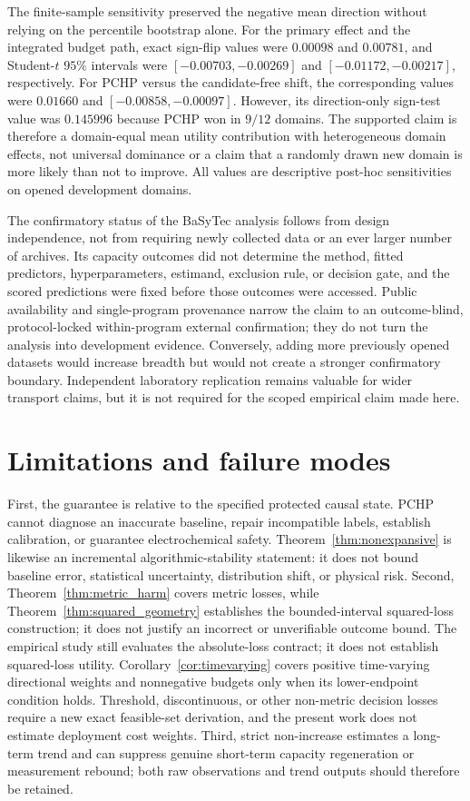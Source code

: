 \documentclass[11pt]{article}
\begin{document}
The finite-sample sensitivity preserved the negative mean direction without relying on the percentile bootstrap alone. For the primary effect and the integrated budget path, exact sign-flip values were $0.00098$ and $0.00781$, and Student-$t$ $95\%$ intervals were $[-0.00703,-0.00269]$ and $[-0.01172,-0.00217]$, respectively. For PCHP versus the candidate-free shift, the corresponding values were $0.01660$ and $[-0.00858,-0.00097]$. However, its direction-only sign-test value was $0.145996$ because PCHP won in $9/12$ domains. The supported claim is therefore a domain-equal mean utility contribution with heterogeneous domain effects, not universal dominance or a claim that a randomly drawn new domain is more likely than not to improve. All values are descriptive post-hoc sensitivities on opened development domains.

The confirmatory status of the BaSyTec analysis follows from design independence, not from requiring newly collected data or an ever larger number of archives. Its capacity outcomes did not determine the method, fitted predictors, hyperparameters, estimand, exclusion rule, or decision gate, and the scored predictions were fixed before those outcomes were accessed. Public availability and single-program provenance narrow the claim to an outcome-blind, protocol-locked within-program external confirmation; they do not turn the analysis into development evidence. Conversely, adding more previously opened datasets would increase breadth but would not create a stronger confirmatory boundary. Independent laboratory replication remains valuable for wider transport claims, but it is not required for the scoped empirical claim made here.

\section{Limitations and failure modes}

First, the guarantee is relative to the specified protected causal state. PCHP cannot diagnose an inaccurate baseline, repair incompatible labels, establish calibration, or guarantee electrochemical safety. Theorem~\ref{thm:nonexpansive} is likewise an incremental algorithmic-stability statement: it does not bound baseline error, statistical uncertainty, distribution shift, or physical risk. Second, Theorem~\ref{thm:metric_harm} covers metric losses, while Theorem~\ref{thm:squared_geometry} establishes the bounded-interval squared-loss construction; it does not justify an incorrect or unverifiable outcome bound. The empirical study still evaluates the absolute-loss contract; it does not establish squared-loss utility. Corollary~\ref{cor:timevarying} covers positive time-varying directional weights and nonnegative budgets only when its lower-endpoint condition holds. Threshold, discontinuous, or other non-metric decision losses require a new exact feasible-set derivation, and the present work does not estimate deployment cost weights. Third, strict non-increase estimates a long-term trend and can suppress genuine short-term capacity regeneration or measurement rebound; both raw observations and trend outputs should therefore be retained.
\end{document}
